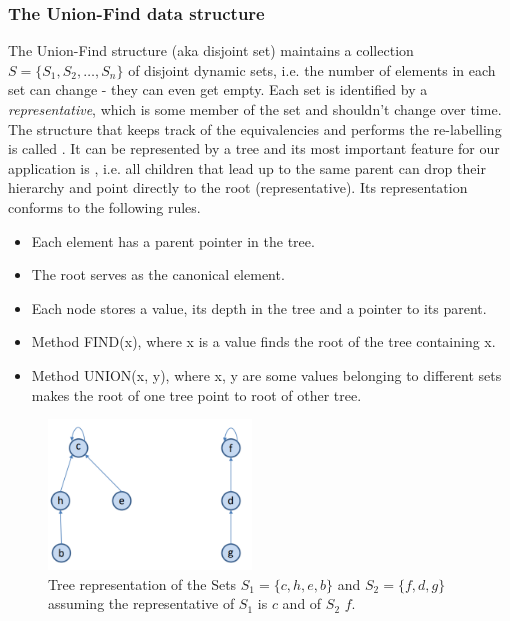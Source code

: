 \documentclass[a4paper]{article}
\begin{document}
\subsubsection{The Union-Find data structure}
The Union-Find structure (aka disjoint set) maintains a collection $S = \{S_1, S_2,\ldots, S_n \}$ of disjoint dynamic sets, i.e. the number of elements in each set can change - they can even get empty. Each set is identified by a \textit{representative}, which is some member of the set and shouldn't change over time.\\
The structure that keeps track of the equivalencies and performs the re-labelling is called . It can be represented by a tree and its most important feature for our application is , i.e. all children that lead up to the same parent can drop their hierarchy and point directly to the root (representative). Its representation conforms to the following rules.
\begin{itemize}
    \item Each element has a parent pointer in the tree.
    \item The root serves as the canonical element.
    \item Each node stores a value, its depth in the tree and a pointer to its parent.
    \item Method FIND(x), where x is a value finds the root of the tree containing x.
    \item Method UNION(x, y), where x, y are some values belonging to different sets makes the root of one tree point to root of other tree.
\end{itemize}
\begin{figure}[H]
    \centering
    \includegraphics[height=4cm]{img/cc/union_find_tree.PNG}
    \caption{Tree representation of the Sets $S_1 = \{c,h,e,b\}$ and $S_2=\{f,d,g\}$ assuming the representative of $S_1$ is $c$ and of $S_2$ $f$.}
\end{figure}
\end{document}
